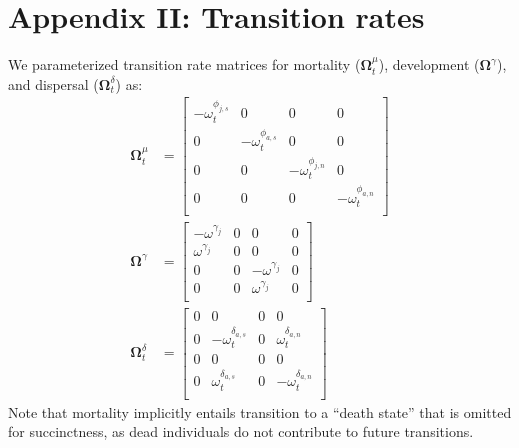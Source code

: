 \section*{Appendix II: Transition rates} 

We parameterized transition rate matrices for mortality ($\boldsymbol\Omega^{\mu}_t$), 
development ($\boldsymbol\Omega^{\gamma}$), 
and dispersal ($\boldsymbol\Omega^{\delta}_t$) as:
\begin{equation} \label{eq:Theta}
\begin{aligned}
\boldsymbol\Omega^{\mu}_t & = 
\left[
\begin{array}{cc|cc}
    -\omega^{\phi_{j,s}}_t & 0 & 0 & 0 \\
    0 & -\omega^{\phi_{a,s}}_t & 0 & 0 \\
    \hline
    0 & 0 & -\omega^{\phi_{j,n}}_t & 0 \\
    0 & 0 & 0 & -\omega^{\phi_{a,n}}_t \\
    \end{array}
\right] \\
\boldsymbol\Omega^{\gamma} & = 
\left[
\begin{array}{cc|cc}
    -\omega^{\gamma_{j}} & 0 & 0 & 0 \\
    \omega^{\gamma_{j}}  & 0 & 0 & 0 \\
    \hline
    0 & 0 & -\omega^{\gamma_{j}} & 0 \\
    0 & 0 & \omega^{\gamma_{j}}  & 0 \\
    \end{array}
\right] \\
\boldsymbol\Omega^{\delta}_t & = 
\left[
\begin{array}{cc|cc}
    0 & 0 & 0 & 0 \\
    0 & -\omega^{\delta_{a,s}}_t & 0 & \omega^{\delta_{a,n}}_t \\
    \hline
    0 & 0 & 0 & 0 \\
    0 & \omega^{\delta_{a,s}}_t & 0 & -\omega^{\delta_{a,n}}_t \\
    \end{array}
\right]
\end{aligned}
\end{equation}
%
Note that mortality implicitly entails transition to a ``death state'' that is omitted 
for succinctness, as dead individuals do not contribute to future transitions.

